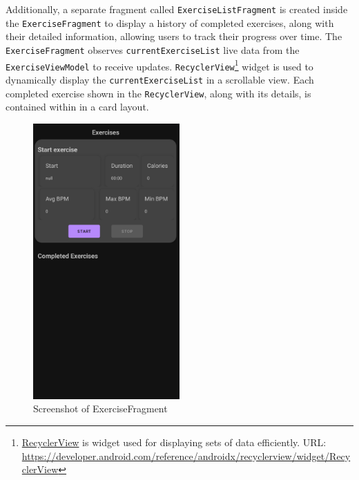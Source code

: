 Additionally, a separate fragment called \texttt{ExerciseListFragment} is created inside the \texttt{ExerciseFragment} to display a history of completed exercises, along with their detailed information, allowing users to track their progress over time. The \texttt{ExerciseFragment} observes \texttt{currentExerciseList} live data from the \texttt{ExerciseViewModel} to receive updates. 
\texttt{RecyclerView}\footnote{\url{RecyclerView} is widget used for displaying sets of data efficiently. URL: \url{https://developer.android.com/reference/androidx/recyclerview/widget/RecyclerView}} widget is used to dynamically display the \texttt{currentExerciseList} in a scrollable view. 
Each completed exercise shown in the \texttt{RecyclerView}, along with its details, is contained within in a card layout.

\begin{figure}[H]
    \centering
    \includegraphics[width=0.5\textwidth]{images/exercisefragment-screenshot.png}
    \caption{Screenshot of ExerciseFragment}
    \label{fig:exercisefragment_screenshot}
\end{figure}

